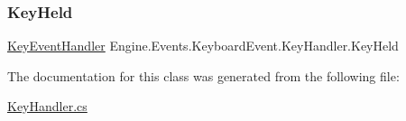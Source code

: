 \subsubsection{\texorpdfstring{Key\+Held}{KeyHeld}}
{\footnotesize\ttfamily \hyperlink{a00366_a0052951197567196fd40ae4d5e7784e1}{Key\+Event\+Handler} Engine.\+Events.\+Keyboard\+Event.\+Key\+Handler.\+Key\+Held}



The documentation for this class was generated from the following file\+:\begin{DoxyCompactItemize}
\item 
\hyperlink{a00056}{Key\+Handler.\+cs}\end{DoxyCompactItemize}

